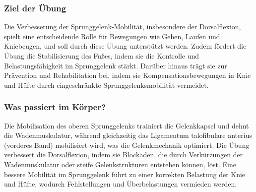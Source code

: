 \subsubsection{Ziel der Übung}
Die Verbesserung der Sprunggelenk-Mobilität, insbesondere der Dorsalflexion, spielt eine entscheidende Rolle für Bewegungen wie Gehen, Laufen und Kniebeugen, und soll durch diese Übung unterstützt werden.
Zudem fördert die Übung die Stabilisierung des Fußes, indem sie die Kontrolle und Belastungsfähigkeit im Sprunggelenk stärkt.
Darüber hinaus trägt sie zur Prävention und Rehabilitation bei, indem sie Kompensationsbewegungen in Knie und Hüfte durch eingeschränkte Sprunggelenksmobilität vermeidet.


\subsubsection{Was passiert im Körper?}
Die Mobilisation des oberen Sprunggelenks trainiert die Gelenkkapsel und dehnt die Wadenmuskulatur, während gleichzeitig das Ligamentum talofibulare anterius (vorderes Band) mobilisiert wird, was die Gelenkmechanik optimiert.
Die Übung verbessert die Dorsalflexion, indem sie Blockaden, die durch Verkürzungen der Wadenmuskulatur oder steife Gelenkstrukturen entstehen können, löst.
Eine bessere Mobilität im Sprunggelenk führt zu einer korrekten Belastung der Knie und Hüfte, wodurch Fehlstellungen und Überbelastungen vermieden werden.

